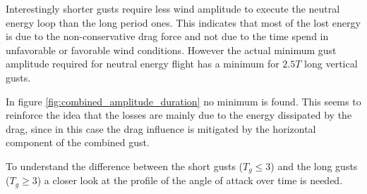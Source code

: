 \par Interestingly shorter gusts require less wind amplitude to execute the neutral energy loop than the long period ones.
This indicates that most of the lost energy is due to the non-conservative drag force and not due to the time spend in unfavorable or favorable wind conditions.
However the actual minimum gust amplitude required for neutral energy flight has a minimum for $2.5T$ long vertical gusts.

\par In figure \ref{fig:combined_amplitude_duration} no minimum is found.
This seems to reinforce the idea that the losses are mainly due to the energy dissipated by the drag, since in this case the drag influence is mitigated by the horizontal component of the combined gust.

%
%
%
%


\FloatBarrier

\par To understand the difference between the short gusts ($T_g \leq 3$) and the long gusts ($T_g \geq 3$) a closer look at the profile of the angle of attack over time is needed.


